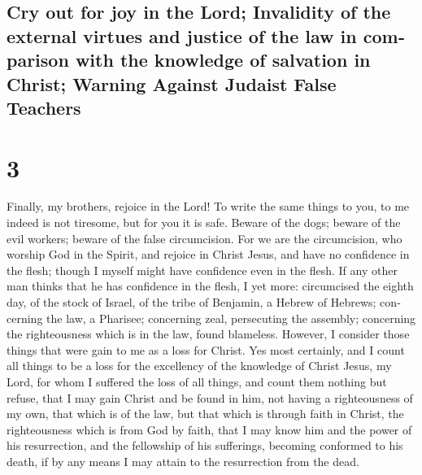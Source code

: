 \begin{paracol}{2}
\switchcolumn
\begin{otherlanguage}{english}

\hypertarget{cry-out-for-joy-in-the-lord-invalidity-of-the-external-virtues-and-justice-of-the-law-in-comparison-with-the-knowledge-of-salvation-in-christ-warning-against-judaist-false-teachers}{%
\subsection{Cry out for joy in the Lord; Invalidity of the external
virtues and justice of the law in comparison with the knowledge of
salvation in Christ; Warning Against Judaist False
Teachers}\label{cry-out-for-joy-in-the-lord-invalidity-of-the-external-virtues-and-justice-of-the-law-in-comparison-with-the-knowledge-of-salvation-in-christ-warning-against-judaist-false-teachers}}

\hypertarget{section-5}{%
\section{3}\label{section-5}}

 Finally, my brothers, rejoice in the Lord! To write the
same things to you, to me indeed is not tiresome, but for you it is
safe.  Beware of the dogs; beware of the evil workers;
beware of the false circumcision.  For we are the
circumcision, who worship God in the Spirit, and rejoice in Christ
Jesus, and have no confidence in the flesh;  though I
myself might have confidence even in the flesh. If any other man thinks
that he has confidence in the flesh, I yet more: 
circumcised the eighth day, of the stock of Israel, of the tribe of
Benjamin, a Hebrew of Hebrews; concerning the law, a Pharisee;
 concerning zeal, persecuting the assembly; concerning the
righteousness which is in the law, found blameless. 
However, I consider those things that were gain to me as a loss for
Christ.  Yes most certainly, and I count all things to be
a loss for the excellency of the knowledge of Christ Jesus, my Lord, for
whom I suffered the loss of all things, and count them nothing but
refuse, that I may gain Christ  and be found in him, not
having a righteousness of my own, that which is of the law, but that
which is through faith in Christ, the righteousness which is from God by
faith,  that I may know him and the power of his
resurrection, and the fellowship of his sufferings, becoming conformed
to his death,  if by any means I may attain to the
resurrection from the dead.


\end{otherlanguage}
\end{paracol}
